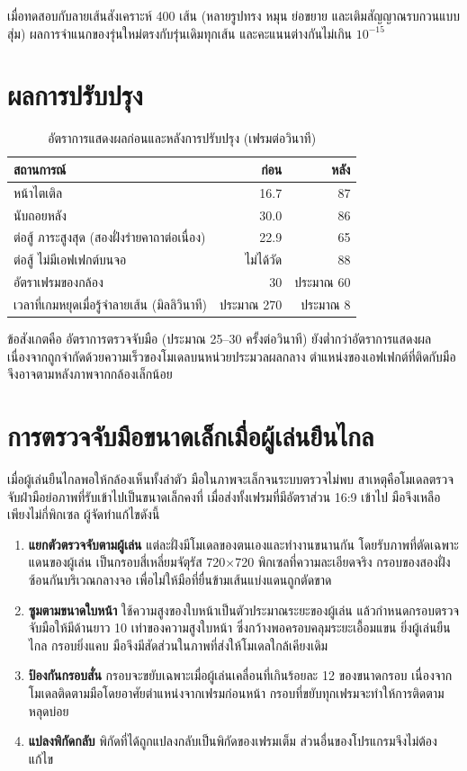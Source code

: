 \documentclass[12pt,a4paper]{report}
\begin{document}
เมื่อทดสอบกับลายเส้นสังเคราะห์ 400 เส้น (หลายรูปทรง หมุน ย่อขยาย และเติมสัญญาณรบกวนแบบสุ่ม)
ผลการจำแนกของรุ่นใหม่ตรงกับรุ่นเดิมทุกเส้น และคะแนนต่างกันไม่เกิน $10^{-15}$

\section{ผลการปรับปรุง}
\begin{table}[H]
  \centering
  \caption{อัตราการแสดงผลก่อนและหลังการปรับปรุง (เฟรมต่อวินาที)}
  \label{tab:fps}
  \begin{tabularx}{\textwidth}{Y r r}
    \toprule
    \textbf{สถานการณ์} & \textbf{ก่อน} & \textbf{หลัง} \\
    \midrule
    หน้าไตเติล & 16.7 & 87 \\
    นับถอยหลัง & 30.0 & 86 \\
    ต่อสู้ ภาระสูงสุด (สองฝั่งร่ายคาถาต่อเนื่อง) & 22.9 & 65 \\
    ต่อสู้ ไม่มีเอฟเฟกต์บนจอ & ไม่ได้วัด & 88 \\
    \midrule
    อัตราเฟรมของกล้อง & 30 & ประมาณ 60 \\
    เวลาที่เกมหยุดเมื่อรู้จำลายเส้น (มิลลิวินาที) & ประมาณ 270 & ประมาณ 8 \\
    \bottomrule
  \end{tabularx}
\end{table}

ข้อสังเกตคือ อัตราการตรวจจับมือ (ประมาณ 25--30 ครั้งต่อวินาที) ยังต่ำกว่าอัตราการแสดงผล
เนื่องจากถูกจำกัดด้วยความเร็วของโมเดลบนหน่วยประมวลผลกลาง ตำแหน่งของเอฟเฟกต์ที่ติดกับมือจึงอาจตามหลังภาพจากกล้องเล็กน้อย

\section{การตรวจจับมือขนาดเล็กเมื่อผู้เล่นยืนไกล}
\label{sec:smallhand}
เมื่อผู้เล่นยืนไกลพอให้กล้องเห็นทั้งลำตัว มือในภาพจะเล็กจนระบบตรวจไม่พบ สาเหตุคือโมเดลตรวจจับฝ่ามือย่อภาพที่รับเข้าไปเป็นขนาดเล็กคงที่
เมื่อส่งทั้งเฟรมที่มีอัตราส่วน 16:9 เข้าไป มือจึงเหลือเพียงไม่กี่พิกเซล ผู้จัดทำแก้ไขดังนี้
\begin{enumerate}[leftmargin=2cm]
  \item \textbf{แยกตัวตรวจจับตามผู้เล่น} แต่ละฝั่งมีโมเดลของตนเองและทำงานขนานกัน โดยรับภาพที่ตัดเฉพาะแดนของผู้เล่น
        เป็นกรอบสี่เหลี่ยมจัตุรัส 720$\times$720 พิกเซลที่ความละเอียดจริง กรอบของสองฝั่งซ้อนกันบริเวณกลางจอ
        เพื่อไม่ให้มือที่ยื่นข้ามเส้นแบ่งแดนถูกตัดขาด
  \item \textbf{ซูมตามขนาดใบหน้า} ใช้ความสูงของใบหน้าเป็นตัวประมาณระยะของผู้เล่น แล้วกำหนดกรอบตรวจจับมือให้มีด้านยาว 10 เท่าของความสูงใบหน้า
        ซึ่งกว้างพอครอบคลุมระยะเอื้อมแขน ยิ่งผู้เล่นยืนไกล กรอบยิ่งแคบ มือจึงมีสัดส่วนในภาพที่ส่งให้โมเดลใกล้เคียงเดิม
  \item \textbf{ป้องกันกรอบสั่น} กรอบจะขยับเฉพาะเมื่อผู้เล่นเคลื่อนที่เกินร้อยละ 12 ของขนาดกรอบ
        เนื่องจากโมเดลติดตามมือโดยอาศัยตำแหน่งจากเฟรมก่อนหน้า กรอบที่ขยับทุกเฟรมจะทำให้การติดตามหลุดบ่อย
  \item \textbf{แปลงพิกัดกลับ} พิกัดที่ได้ถูกแปลงกลับเป็นพิกัดของเฟรมเต็ม ส่วนอื่นของโปรแกรมจึงไม่ต้องแก้ไข
\end{enumerate}
\end{document}
